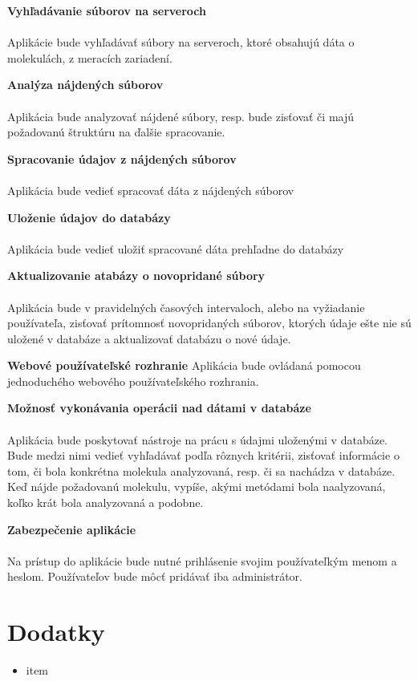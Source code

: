 \documentclass[12pt,a4paper]{article}
\begin{document}
\begin{enumerate}[label={[\arabic*]}]
	\item { \bf Vyhľadávanie súborov na serveroch } \\ \\
	Aplikácie bude vyhľadávať súbory na serveroch, ktoré obsahujú dáta o molekulách, z meracích zariadení.
	\item { \bf Analýza nájdených súborov } \\ \\
	Aplikácia bude analyzovať nájdené súbory, resp. bude zisťovať či majú požadovanú štruktúru na ďalšie spracovanie.
	\item { \bf Spracovanie údajov z nájdených súborov } \\ \\
	Aplikácia bude vedieť spracovať dáta z nájdených súborov 
	\item { \bf Uloženie údajov do databázy }\\ \\
	Aplikácia bude vedieť uložiť spracované dáta prehľadne do databázy
	\item { \bf Aktualizovanie atabázy o novopridané súbory } \\ \\
	Aplikácia bude v pravidelných časových intervaloch, alebo na vyžiadanie používateľa,  zisťovať prítomnosť novopridaných súborov, ktorých údaje ešte nie sú uložené v databáze a aktualizovať databázu o nové údaje.
	\item { \bf  Webové používateľské rozhranie }
	Aplikácia bude ovládaná pomocou jednoduchého webového používateľského rozhrania.
	\item { \bf Možnosť vykonávania operácii nad dátami v databáze }\\ \\
	Aplikácia bude poskytovať nástroje na prácu s údajmi uloženými v databáze. Bude medzi nimi vedieť vyhľadávať podľa rôznych kritérii, zisťovať informácie o tom, či bola konkrétna molekula analyzovaná, resp. či sa nachádza v databáze. Keď nájde požadovanú molekulu, vypíše, akými metódami bola naalyzovaná, koľko krát bola analyzovaná a podobne.
	\item { \bf Zabezpečenie aplikácie } \\ \\
	Na prístup do aplikácie bude nutné prihlásenie svojim používateľkým menom a heslom. Používateľov bude môcť pridávať iba administrátor. 
	
\end{enumerate}

\section{Dodatky}
\begin{itemize}
	\item item
\end{itemize}
\end{document}
